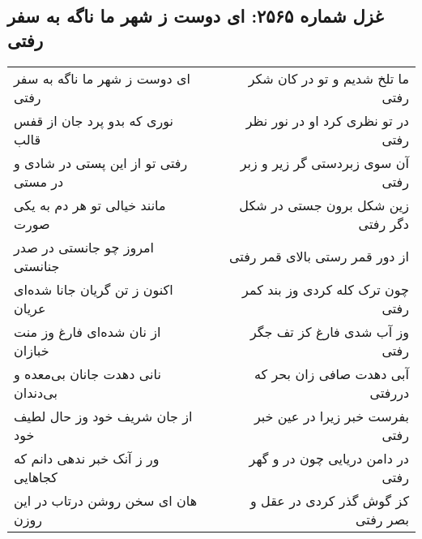 \begin{center}
\section*{غزل شماره ۲۵۶۵: ای دوست ز شهر ما ناگه به سفر رفتی}
\label{sec:2565}
\begin{longtable}{l p{0.5cm} r}
ای دوست ز شهر ما ناگه به سفر رفتی
&&
ما تلخ شدیم و تو در کان شکر رفتی
\\
نوری که بدو پرد جان از قفس قالب
&&
در تو نظری کرد او در نور نظر رفتی
\\
رفتی تو از این پستی در شادی و در مستی
&&
آن سوی زبردستی گر زیر و زبر رفتی
\\
مانند خیالی تو هر دم به یکی صورت
&&
زین شکل برون جستی در شکل دگر رفتی
\\
امروز چو جانستی در صدر جنانستی
&&
از دور قمر رستی بالای قمر رفتی
\\
اکنون ز تن گریان جانا شده‌ای عریان
&&
چون ترک کله کردی وز بند کمر رفتی
\\
از نان شده‌ای فارغ وز منت خبازان
&&
وز آب شدی فارغ کز تف جگر رفتی
\\
نانی دهدت جانان بی‌معده و بی‌دندان
&&
آبی دهدت صافی زان بحر که دررفتی
\\
از جان شریف خود وز حال لطیف خود
&&
بفرست خبر زیرا در عین خبر رفتی
\\
ور ز آنک خبر ندهی دانم که کجاهایی
&&
در دامن دریایی چون در و گهر رفتی
\\
هان ای سخن روشن درتاب در این روزن
&&
کز گوش گذر کردی در عقل و بصر رفتی
\\
\end{longtable}
\end{center}

